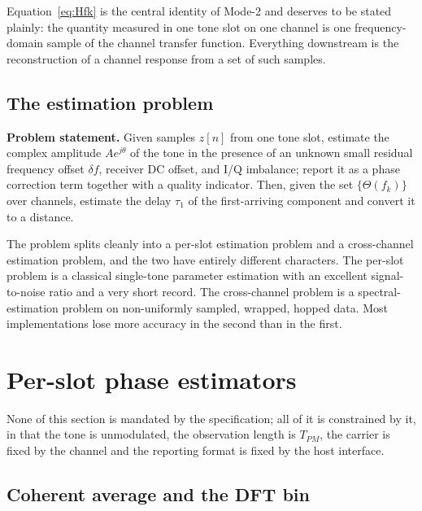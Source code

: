\documentclass[11pt,a4paper]{article}
\newcommand{\Tpm}{T_{PM}}
\begin{document}
Equation~\eqref{eq:Hfk} is the central identity of Mode-2 and deserves to be stated plainly: the
quantity measured in one tone slot on one channel is one frequency-domain sample of the channel
transfer function. Everything downstream is the reconstruction of a channel response from a set of
such samples.

\subsection{The estimation problem}

\begin{callout}
\textbf{Problem statement.} Given samples $z[n]$ from one tone slot, estimate the complex amplitude
$Ae^{j\theta}$ of the tone in the presence of an unknown small residual frequency offset $\delta f$,
receiver DC offset, and I/Q imbalance; report it as a phase correction term together with a quality
indicator. Then, given the set $\{\Theta(f_k)\}$ over channels, estimate the delay $\tau_1$ of the
first-arriving component and convert it to a distance.
\end{callout}

The problem splits cleanly into a per-slot estimation problem and a cross-channel estimation problem,
and the two have entirely different characters. The per-slot problem is a classical single-tone
parameter estimation with an excellent signal-to-noise ratio and a very short record. The
cross-channel problem is a spectral-estimation problem on non-uniformly sampled, wrapped, hopped
data. Most implementations lose more accuracy in the second than in the first.

\section{Per-slot phase estimators}
\label{sec:phaseest}

None of this section is mandated by the specification; all of it is constrained by it, in that the
tone is unmodulated, the observation length is $\Tpm$, the carrier is fixed by the channel and the
reporting format is fixed by the host interface.

\subsection{Coherent average and the DFT bin}
\label{sec:coh}
\end{document}
